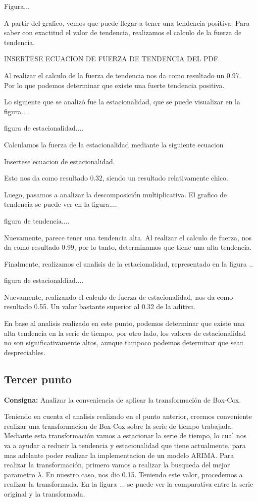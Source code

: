 \documentclass{article} %
\begin{document}
Figura... 

A partir del grafico, vemos que puede llegar a tener una tendencia positiva. Para saber con exactitud el valor de tendencia, realizamos el calculo de la fuerza de tendencia. 

INSERTESE ECUACION DE FUERZA DE TENDENCIA DEL PDF. 

Al realizar el calculo de la fuerza de tendencia nos da como resultado un 0.97. Por lo que podemos determinar que existe una fuerte tendencia positiva.

Lo siguiente que se analizó fue la estacionalidad, que se puede visualizar en la figura....



figura de estacionalidad.... 


Calculamos la fuerza de la estacionalidad mediante la siguiente ecuacion


Insertese ecuacion de estacionalidad.


Esto nos da como resultado 0.32, siendo un resultado relativamente chico.

Luego, pasamos a analizar la descomposición multiplicativa. El grafico de tendencia se puede ver en la figura.... 


figura de tendencia....

Nuevamente, parece tener una tendencia alta. Al realizar el calculo de fuerza, nos da como resultado 0.99, por lo tanto, determinamos que tiene una alta tendencia.

Finalmente, realizamos el analisis de la estacionalidad, representado en la figura ..

figura de estacionaldiad....

Nuevamente, realizando el calculo de fuerza de estacionalidad, nos da como resultado 0.55. Un valor bastante superior al 0.32 de la aditiva. 

En base al analisis realizado en este punto, podemos determinar que existe una alta tendencia en la serie de tiempo, por otro lado, los valores de estacionalidad no son significativamente altos, aunque tampoco podemos determinar que sean despreciables.

\subsection{Tercer punto}

\textbf{Consigna:} Analizar la conveniencia de aplicar la transformación de Box-Cox.

Teniendo en cuenta el analisis realizado en el punto anterior, creemos conveniente realizar una transformacion de Box-Cox sobre la serie de tiempo trabajada. Mediante esta transformación vamos a estacionar la serie de tiempo, lo cual nos va a ayudar a reducir la tendencia y estacionalidad que tiene actualmente, para mas adelante poder realizar la implementacion de un modelo ARIMA. 
Para realizar la transformación, primero vamos a realizar la busqueda del mejor parametro $\lambda$. En nuestro caso, nos dio 0.15. Teniendo este valor, procedemos a realizar la transformada. En la figura ... se puede ver la comparativa entre la serie original y la transformada.
\end{document}
